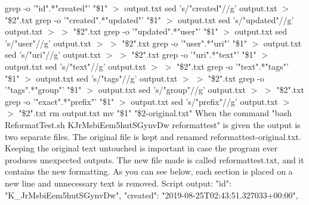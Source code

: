 \documentclass{article}
\begin{document}
\newline
grep -o '"id".*"created"' "\$1" $>$ output.txt
\newline
sed 's/"created"//g' output.txt  $>$ "\$2".txt
\newline
grep -o '"created".*"updated"' "\$1"  $>$ output.txt
\newline
sed 's/"updated"//g' output.txt  $>$ $>$ "\$2".txt
\newline
grep -o '"updated".*"user"' "\$1" $ >$ output.txt
\newline
sed 's/"user"//g' output.txt  $>$ $>$  "\$2".txt
\newline
grep -o '"user".*"uri"' "\$1"  $>$ output.txt
\newline
sed 's/"uri"//g' output.txt  $>$ $>$ "\$2".txt
\newline
grep -o '"uri".*"text"' "\$1"  $>$ output.txt
\newline
sed 's/"text"//g' output.txt  $>$ $>$ "\$2".txt
\newline
grep -o '"text".*"tags"' "\$1"  $>$ output.txt
\newline
sed 's/"tags"//g' output.txt  $>$ $>$ "\$2".txt
\newline
grep -o '"tags".*"group"' "\$1"  $>$ output.txt
\newline
sed 's/"group"//g' output.txt  $>$ $>$ "\$2".txt
\newline
grep -o '"exact".*"prefix"' "\$1" $>$ output.txt
\newline
sed 's/"prefix"//g' output.txt  $>$ $>$  "\$2".txt
\newline
rm output.txt
\newline
mv "\$1" "\$2-original.txt"
\newline
\newline
When the command "bash ReformatTest.sh K\textunderscore JrMsbiEem5hutSGynvDw reformattest" is given the output is two separate files. The original file is kept and renamed reformattest-original.txt. Keeping the original text untouched is important in case the program ever produces unexpected outputs.  The new file made is called reformattest.txt, and it contains the new formatting. As you can see below, each section is placed on a new line and unnecessary text is removed.  
\newline
\newline
Script output:
\newline
\newline
"id": "K\_JrMsbiEem5hutSGynvDw", 
\newline
"created": "2019-08-25T02:43:51.327033+00:00", 
\end{document}
